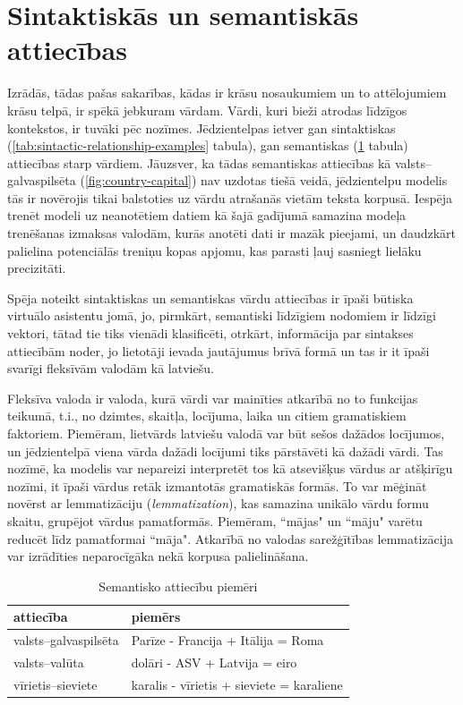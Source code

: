 \section{Sintaktiskās un semantiskās attiecības}

Izrādās, tādas pašas sakarības, kādas ir krāsu nosaukumiem un to attēlojumiem krāsu telpā, ir spēkā jebkuram vārdam. Vārdi, kuri bieži atrodas līdzīgos kontekstos, ir tuvāki pēc nozīmes. Jēdzientelpas ietver gan sintaktiskas (\ref{tab:sintactic-relationship-examples} tabula), gan semantiskas (\ref{tab:semantic-relationship-examples} tabula) attiecības starp vārdiem. Jāuzsver, ka tādas semantiskas attiecības kā valsts--galvaspilsēta (\ref{fig:country-capital}) nav uzdotas tiešā veidā, jēdzientelpu modelis tās ir novērojis tikai balstoties uz vārdu atrašanās vietām teksta korpusā. Iespēja trenēt modeli uz neanotētiem datiem kā šajā gadījumā samazina modeļa trenēšanas izmaksas valodām, kurās anotēti dati ir mazāk pieejami, un daudzkārt palielina potenciālās treniņu kopas apjomu, kas parasti ļauj sasniegt lielāku precizitāti.

Spēja noteikt sintaktiskas un semantiskas vārdu attiecības ir īpaši būtiska virtuālo asistentu jomā, jo, pirmkārt, semantiski līdzīgiem nodomiem ir līdzīgi vektori, tātad tie tiks vienādi klasificēti, otrkārt, informācija par sintakses attiecībām noder, jo lietotāji ievada jautājumus brīvā formā un tas ir it īpaši svarīgi fleksīvām valodām kā latviešu.

Fleksīva valoda ir valoda, kurā vārdi var mainīties atkarībā no to funkcijas teikumā, t.i., no dzimtes, skaitļa, locījuma, laika un citiem gramatiskiem faktoriem. Piemēram, lietvārds latviešu valodā var būt sešos dažādos locījumos, un jēdzientelpā viena vārda dažādi locījumi tiks pārstāvēti kā dažādi vārdi. Tas nozīmē, ka modelis var nepareizi interpretēt tos kā atsevišķus vārdus ar atšķirīgu nozīmi, it īpaši vārdus retāk izmantotās gramatiskās formās. To var mēģināt novērst ar lemmatizāciju (\textit{lemmatization}), kas samazina unikālo vārdu formu skaitu, grupējot vārdus pamatformās. Piemēram, “mājas" un “māju" varētu reducēt līdz pamatformai “māja". Atkarībā no valodas sarežģītības lemmatizācija var izrādīties neparocīgāka nekā korpusa palielināšana.


\begin{table}[htbp]
	\centering
	\caption{Semantisko attiecību piemēri \cite{word2vec2013}}
	\begin{tabular}{ll}\toprule
		attiecība & piemērs  \\\midrule
		valsts--galvaspilsēta   & Parīze - Francija + Itālija = Roma \\
		valsts--valūta   & dolāri - ASV + Latvija = eiro \\
		vīrietis--sieviete   & karalis - vīrietis + sieviete = karaliene \\\bottomrule
	\end{tabular}%
	\label{tab:semantic-relationship-examples}%
\end{table}

